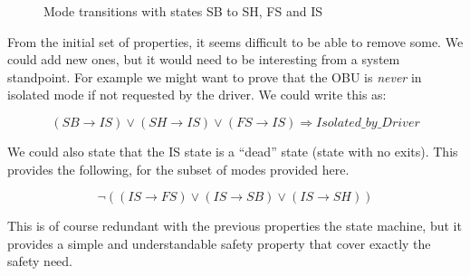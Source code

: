 \documentclass{template/openetcs_article}
\def\implies{\Rightarrow}
\begin{document}
\begin{figure}
  \centering
  \caption{Mode transitions with states SB to SH, FS and IS}
  \label{fig:trans_whole}
\end{figure}

From the initial set of properties, it seems difficult to be able to remove some. We could add new ones,
but it would need to be interesting from a system standpoint. For example we might want to prove that 
the OBU is \emph{never} in isolated mode if not requested by the driver. We could write this as:

$$(SB\rightarrow IS) \lor (SH\rightarrow IS) \lor (FS\rightarrow IS) \implies Isolated\_by\_Driver$$

We could also state that the IS state is a ``dead'' state (state with no exits). This provides the 
following, for the subset of modes provided here.

$$\lnot((IS \rightarrow FS) \lor (IS \rightarrow SB) \lor (IS \rightarrow SH))$$

This is of course redundant with the previous properties the state machine, but it provides a 
simple and understandable safety property that cover exactly the safety need.
\end{document}
